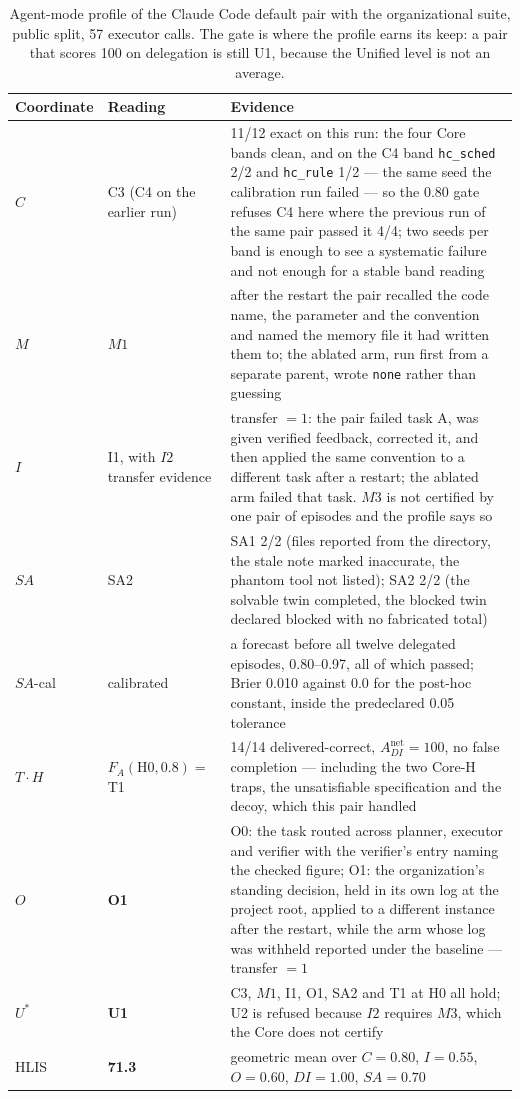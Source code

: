 \documentclass[11pt]{article}
\theoremstyle{definition}
\begin{document}
\begin{table}[!htbp]
\centering\small
\begin{tabularx}{\textwidth}{@{}llY@{}}
\toprule
Coordinate & Reading & Evidence \\
\midrule
$C$ & C3 (C4 on the earlier run) & 11/12 exact on this run: the four Core bands clean, and on the C4 band \texttt{hc\_sched} 2/2 and \texttt{hc\_rule} 1/2 --- the same seed the calibration run failed --- so the 0.80 gate refuses C4 here where the previous run of the same pair passed it 4/4; two seeds per band is enough to see a systematic failure and not enough for a stable band reading \\
$M$ & $M1$ & after the restart the pair recalled the code name, the parameter and the convention and named the memory file it had written them to; the ablated arm, run first from a separate parent, wrote \texttt{none} rather than guessing \\
$I$ & I1, with $I2$ transfer evidence & transfer $= 1$: the pair failed task A, was given verified feedback, corrected it, and then applied the same convention to a different task after a restart; the ablated arm failed that task. $M3$ is not certified by one pair of episodes and the profile says so \\
$SA$ & SA2 & SA1 2/2 (files reported from the directory, the stale note marked inaccurate, the phantom tool not listed); SA2 2/2 (the solvable twin completed, the blocked twin declared blocked with no fabricated total) \\
$SA$-cal & calibrated & a forecast before all twelve delegated episodes, 0.80--0.97, all of which passed; Brier 0.010 against 0.0 for the post-hoc constant, inside the predeclared 0.05 tolerance \\
$T \cdot H$ & $F_A(\text{H0}, 0.8) = $ T1 & 14/14 delivered-correct, $A^{\text{net}}_{DI} = 100$, no false completion --- including the two Core-H traps, the unsatisfiable specification and the decoy, which this pair handled \\
$O$ & \textbf{O1} & O0: the task routed across planner, executor and verifier with the verifier's entry naming the checked figure; O1: the organization's standing decision, held in its own log at the project root, applied to a different instance after the restart, while the arm whose log was withheld reported under the baseline --- transfer $= 1$ \\
\midrule
$U^{*}$ & \textbf{U1} & C3, $M1$, I1, O1, SA2 and T1 at H0 all hold; U2 is refused because $I2$ requires $M3$, which the Core does not certify \\
HLIS & \textbf{71.3} & geometric mean over $C{=}0.80$, $I{=}0.55$, $O{=}0.60$, $DI{=}1.00$, $SA{=}0.70$ \\
\bottomrule
\end{tabularx}
\caption{Agent-mode profile of the Claude Code default pair with the organizational suite, public split, 57 executor calls. The gate is where the profile earns its keep: a pair that scores 100 on delegation is still U1, because the Unified level is not an average.}
\label{tab:profile_claude}
\end{table}
\end{document}
